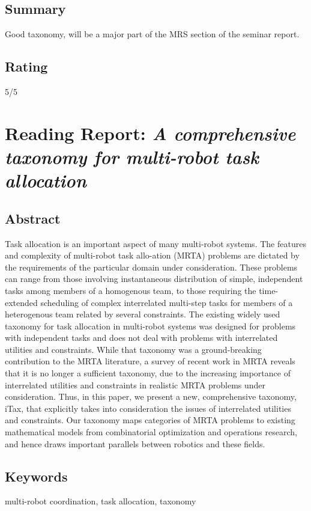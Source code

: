 \subsection*{Summary}
Good taxonomy, will be a major part of the MRS section of the seminar report.
\subsection*{Rating}
5/5

\section{Reading Report: \emph{A comprehensive taxonomy for multi-robot task allocation}}
\cite{Korsah2013}

\subsection*{Abstract}
Task allocation is an important aspect of many multi-robot systems. The features and complexity of multi-robot task allo-ation (MRTA) problems are dictated by the requirements of the particular domain under consideration. These problems
can range from those involving instantaneous distribution of simple, independent tasks among members of a homogenous
team, to those requiring the time-extended scheduling of complex interrelated multi-step tasks for members of a heterogenous team related by several constraints. The existing widely used taxonomy for task allocation in multi-robot systems was
designed for problems with independent tasks and does not deal with problems with interrelated utilities and constraints.
While that taxonomy was a ground-breaking contribution to the MRTA literature, a survey of recent work in MRTA reveals
that it is no longer a sufficient taxonomy, due to the increasing importance of interrelated utilities and constraints in
realistic MRTA problems under consideration. Thus, in this paper, we present a new, comprehensive taxonomy, iTax, that
explicitly takes into consideration the issues of interrelated utilities and constraints. Our taxonomy maps categories of
MRTA problems to existing mathematical models from combinatorial optimization and operations research, and hence
draws important parallels between robotics and these fields.

\subsection*{Keywords}
multi-robot coordination, task allocation, taxonomy

